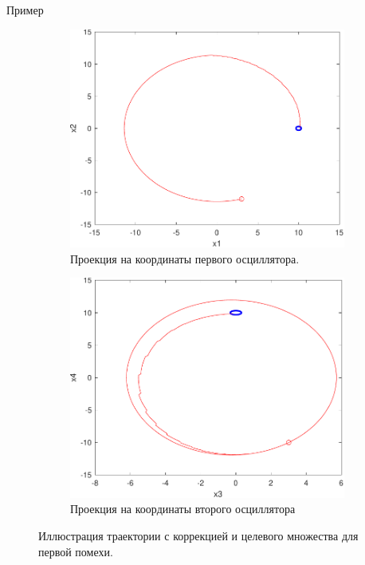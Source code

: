 \begin{section}{Пример}
\begin{figure}[ht]
    \centering
    \begin{subfigure}[b]{0.45\textwidth}
        \centering
        \includegraphics[width=\textwidth]{./resources/synthesis_8_first.pdf}
        \caption{Проекция на координаты первого осциллятора.}
        \label{subfig:synthesis_1_first}
    \end{subfigure}
    \hfill
    \begin{subfigure}[b]{0.45\textwidth}
        \centering
        \includegraphics[width=\textwidth]{./resources/synthesis_8_second.pdf}
        \caption{Проекция на координаты второго осциллятора}
        \label{subfig:synthesis_1_second}
    \end{subfigure}
    \caption{Иллюстрация траектории с коррекцией и целевого множества для первой помехи.}
    \label{fig:synthesis_1}
\end{figure}
\end{section}

